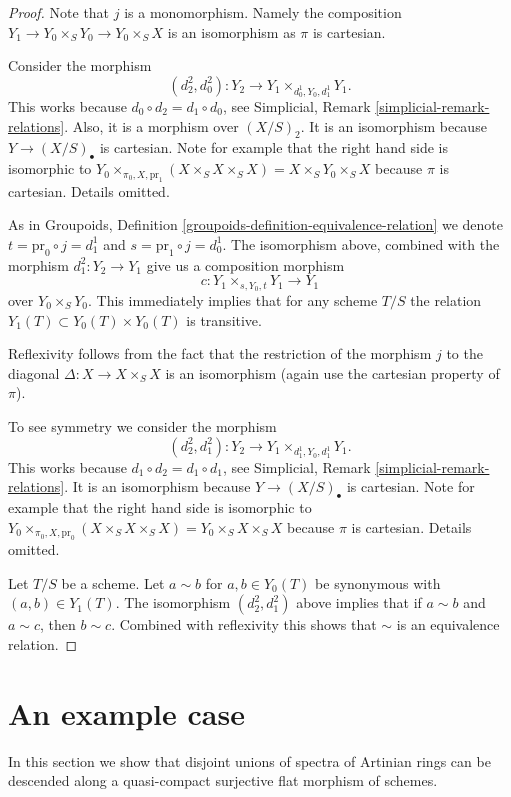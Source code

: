 \begin{proof}
Note that $j$ is a monomorphism. Namely the
composition $Y_1 \to Y_0 \times_S Y_0 \to Y_0 \times_S X$
is an isomorphism as $\pi$ is cartesian.

\medskip\noindent
Consider the morphism
$$
(d^2_2, d^2_0) : Y_2 \to Y_1 \times_{d^1_0, Y_0, d^1_1} Y_1.
$$
This works because $d_0 \circ d_2 = d_1 \circ d_0$,
see Simplicial, Remark \ref{simplicial-remark-relations}.
Also, it is a morphism over $(X/S)_2$. It is an isomorphism
because $Y \to (X/S)_\bullet$ is cartesian. Note for example that the
right hand side is isomorphic to
$Y_0 \times_{\pi_0, X, \text{pr}_1} (X \times_S X \times_S X) =
X \times_S Y_0 \times_S X$
because $\pi$ is cartesian. Details omitted.

\medskip\noindent
As in Groupoids, Definition \ref{groupoids-definition-equivalence-relation}
we denote $t = \text{pr}_0 \circ j = d^1_1$ and
$s = \text{pr}_1 \circ j = d^1_0$.
The isomorphism above, combined with the morphism
$d^2_1 : Y_2 \to Y_1$ give us a composition morphism
$$
c : Y_1 \times_{s, Y_0, t} Y_1 \longrightarrow Y_1
$$
over $Y_0 \times_S Y_0$. This immediately implies
that for any scheme $T/S$ the relation
$Y_1(T) \subset Y_0(T) \times Y_0(T)$ is transitive.

\medskip\noindent
Reflexivity follows from the fact that the
restriction of the morphism $j$ to the diagonal
$\Delta : X \to X \times_S X$ is an isomorphism
(again use the cartesian property of $\pi$).

\medskip\noindent
To see symmetry we consider the morphism
$$
(d^2_2, d^2_1) : Y_2 \to Y_1 \times_{d^1_1, Y_0, d^1_1} Y_1.
$$
This works because $d_1 \circ d_2 = d_1 \circ d_1$,
see Simplicial, Remark \ref{simplicial-remark-relations}.
It is an isomorphism
because $Y \to (X/S)_\bullet$ is cartesian.
Note for example that the
right hand side is isomorphic to
$Y_0 \times_{\pi_0, X, \text{pr}_0} (X \times_S X \times_S X) =
Y_0 \times_S X \times_S X$
because $\pi$ is cartesian. Details omitted.

\medskip\noindent
Let $T/S$ be a scheme. Let $a \sim b$ for $a, b \in Y_0(T)$
be synonymous with $(a, b) \in Y_1(T)$.
The isomorphism $(d^2_2, d^2_1)$ above
implies that if $a \sim b$ and $a \sim c$, then $b \sim c$.
Combined with reflexivity this shows that $\sim$ is
an equivalence relation.
\end{proof}

\section{An example case}
\label{spaces-simplicial-section-example}
In this section we show that disjoint unions of spectra
of Artinian rings can be descended along a quasi-compact
surjective flat morphism of schemes.

